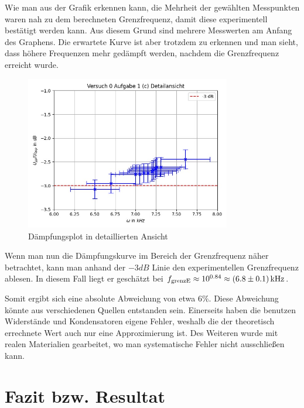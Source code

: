 \documentclass{article}
\begin{document}
\begin{enumerate}[label=\alph*]
        Wie man aus der Grafik erkennen kann, die Mehrheit der gewählten Messpunkten waren nah zu dem 
         berechneten Grenzfrequenz, damit diese experimentell bestätigt werden kann. Aus diesem Grund sind mehrere Messwerten am Anfang des Graphens. Die erwartete Kurve ist aber trotzdem zu erkennen und man sieht, dass höhere Frequenzen mehr gedämpft werden, nachdem die Grenzfrequenz erreicht wurde.  
         
         
         \begin{figure}[H]
             \centering
             \includegraphics[width=0.8\textwidth]{figs/versuch0_1cdet}
             \caption{Dämpfungsplot in detaillierten Ansicht}
             \label{0_1_(c)_Dämpfung_detail}
         \end{figure}
         
         Wenn man nun die Dämpfungskurve im Bereich der Grenzfrequenz näher betrachtet, kann man anhand der $-3dB$ Linie den experimentellen Grenzfrequenz ablesen. In diesem Fall liegt er geschätzt bei $f_{\text{grenzE}} \approx  10^{0.84} \approx\SI{6.8 \pm 0.1}{\kilo\hertz}$. 
         
        Somit ergibt sich eine absolute Abweichung von etwa $6 \% $. Diese Abweichung könnte aus verschiedenen Quellen entstanden sein. Einerseits haben die benutzen Widerstände und Kondensatoren eigene Fehler, weshalb die der theoretisch errechnete Wert auch nur eine Approximierung ist. Des Weiteren wurde mit realen Materialien gearbeitet, wo man systematische Fehler nicht ausschließen kann.
         
        \end{enumerate}

        \section{Fazit bzw. Resultat}
        
\end{document}
